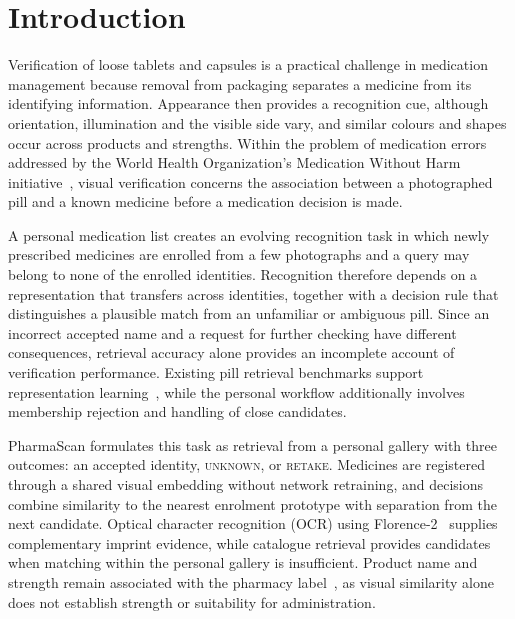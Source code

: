 \section{Introduction}
\label{sec:problem}
Verification of loose tablets and capsules is a practical challenge in medication management because removal from packaging separates a medicine from its identifying information. Appearance then provides a recognition cue, although orientation, illumination and the visible side vary, and similar colours and shapes occur across products and strengths. Within the problem of medication errors addressed by the World Health Organization's Medication Without Harm initiative~\citep{who2017medication}, visual verification concerns the association between a photographed pill and a known medicine before a medication decision is made.

A personal medication list creates an evolving recognition task in which newly prescribed medicines are enrolled from a few photographs and a query may belong to none of the enrolled identities. Recognition therefore depends on a representation that transfers across identities, together with a decision rule that distinguishes a plausible match from an unfamiliar or ambiguous pill. Since an incorrect accepted name and a request for further checking have different consequences, retrieval accuracy alone provides an incomplete account of verification performance. Existing pill retrieval benchmarks support representation learning~\citep{usuyama2020epillid,ling2020fewshot}, while the personal workflow additionally involves membership rejection and handling of close candidates.

PharmaScan formulates this task as retrieval from a personal gallery with three outcomes: an accepted identity, \textsc{unknown}, or \textsc{retake}. Medicines are registered through a shared visual embedding without network retraining, and decisions combine similarity to the nearest enrolment prototype with separation from the next candidate. Optical character recognition (OCR) using \mbox{Florence-2}~\citep{xiao2024florence2} supplies complementary imprint evidence, while catalogue retrieval provides candidates when matching within the personal gallery is insufficient. Product name and strength remain associated with the pharmacy label~\citep{moh_medication_label}, as visual similarity alone does not establish strength or suitability for administration.

